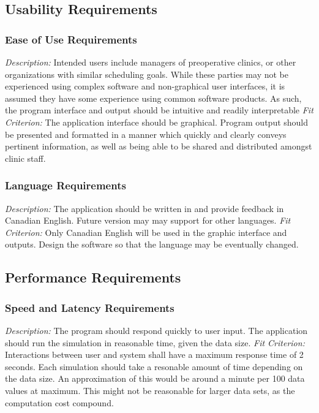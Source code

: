 \documentclass[12pt, titlepage]{article}
\begin{document}
\subsection{Usability Requirements}
\subsubsection{Ease of Use Requirements}
\textit{Description:}\newline
Intended users include managers of preoperative clinics, or other organizations with similar scheduling goals. While these parties may not be experienced using complex software and non-graphical user interfaces, it is assumed they have some experience using common software products. As such, the program interface and output should be intuitive and readily interpretable
\newline \newline 
\textit{Fit Criterion:}\newline 
The application interface should be graphical.
Program output should be presented and formatted in a manner which quickly and clearly conveys pertinent information, as well as being able to be shared and distributed amongst clinic staff.
\subsubsection{Language Requirements}
\textit{Description:}\newline
The application should be written in and provide feedback in Canadian English. Future version may may support for other languages.
\newline \newline 
\textit{Fit Criterion:}\newline 
Only Canadian English will be used in the graphic interface and outputs.
Design the software so that the language may be eventually changed.

\subsection{Performance Requirements}
\subsubsection{Speed and Latency Requirements}
\textit{Description:}\newline
The program should respond quickly to user input. The application should run the simulation in reasonable time, given the data size.
\newline \newline 
\textit{Fit Criterion:}\newline 
Interactions between user and system shall have a maximum response time of 2 seconds. Each simulation should take a resonable amount of time depending on the data size. An approximation of this would be around a minute per 100 data values at maximum. This might not be reasonable for larger data sets, as the computation cost compound.
\end{document}
